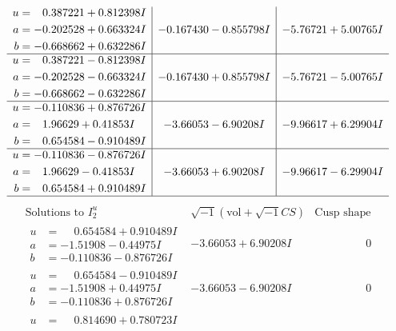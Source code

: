 \documentclass[1p]{elsarticle_modified}
\theoremstyle{definition}
\newcommand{\I}{\sqrt{-1}}
\begin{document}
$$\begin{array}{c|c|c}
\begin{aligned}
u &= \phantom{-}0.387221 + 0.812398 I \\
a &= -0.202528 + 0.663324 I \\
b &= -0.668662 + 0.632286 I\end{aligned}
 & -0.167430 - 0.855798 I & -5.76721 + 5.00765 I \\ \hline\begin{aligned}
u &= \phantom{-}0.387221 - 0.812398 I \\
a &= -0.202528 - 0.663324 I \\
b &= -0.668662 - 0.632286 I\end{aligned}
 & -0.167430 + 0.855798 I & -5.76721 - 5.00765 I \\ \hline\begin{aligned}
u &= -0.110836 + 0.876726 I \\
a &= \phantom{-}1.96629 + 0.41853 I \\
b &= \phantom{-}0.654584 - 0.910489 I\end{aligned}
 & -3.66053 - 6.90208 I & -9.96617 + 6.29904 I \\ \hline\begin{aligned}
u &= -0.110836 - 0.876726 I \\
a &= \phantom{-}1.96629 - 0.41853 I \\
b &= \phantom{-}0.654584 + 0.910489 I\end{aligned}
 & -3.66053 + 6.90208 I & -9.96617 - 6.29904 I\\
 \hline 
 \end{array}$$\newpage$$\begin{array}{c|c|c}  
\text{Solutions to }I^u_{2}& \I (\text{vol} + \sqrt{-1}CS) & \text{Cusp shape}\\
 \hline 
\begin{aligned}
u &= \phantom{-}0.654584 + 0.910489 I \\
a &= -1.51908 - 0.44975 I \\
b &= -0.110836 - 0.876726 I\end{aligned}
 & -3.66053 + 6.90208 I & \phantom{-0.000000 } 0 \\ \hline\begin{aligned}
u &= \phantom{-}0.654584 - 0.910489 I \\
a &= -1.51908 + 0.44975 I \\
b &= -0.110836 + 0.876726 I\end{aligned}
 & -3.66053 - 6.90208 I & \phantom{-0.000000 } 0 \\ \hline\begin{aligned}
u &= \phantom{-}0.814690 + 0.780723 I \\

\end{aligned}
\end{array}$$
\end{document}
